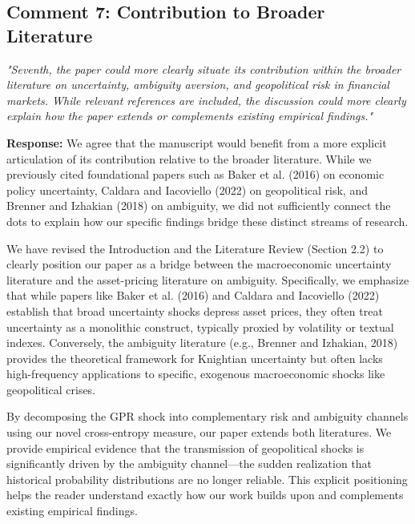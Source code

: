 \documentclass[12pt]{article}
\begin{document}
\subsection*{Comment 7: Contribution to Broader Literature}
\textit{"Seventh, the paper could more clearly situate its contribution within the broader literature on uncertainty, ambiguity aversion, and geopolitical risk in financial markets. While relevant references are included, the discussion could more clearly explain how the paper extends or complements existing empirical findings."}

\begin{highlightbox}
\textbf{Response:} We agree that the manuscript would benefit from a more explicit articulation of its contribution relative to the broader literature. While we previously cited foundational papers such as Baker et al. (2016) on economic policy uncertainty, Caldara and Iacoviello (2022) on geopolitical risk, and Brenner and Izhakian (2018) on ambiguity, we did not sufficiently connect the dots to explain how our specific findings bridge these distinct streams of research.

We have revised the Introduction and the Literature Review (Section 2.2) to clearly position our paper as a bridge between the macroeconomic uncertainty literature and the asset-pricing literature on ambiguity. Specifically, we emphasize that while papers like Baker et al. (2016) and Caldara and Iacoviello (2022) establish that broad uncertainty shocks depress asset prices, they often treat uncertainty as a monolithic construct, typically proxied by volatility or textual indexes. Conversely, the ambiguity literature (e.g., Brenner and Izhakian, 2018) provides the theoretical framework for Knightian uncertainty but often lacks high-frequency applications to specific, exogenous macroeconomic shocks like geopolitical crises.

By decomposing the GPR shock into complementary risk and ambiguity channels using our novel cross-entropy measure, our paper extends both literatures. We provide empirical evidence that the transmission of geopolitical shocks is significantly driven by the ambiguity channel—the sudden realization that historical probability distributions are no longer reliable. This explicit positioning helps the reader understand exactly how our work builds upon and complements existing empirical findings.
\end{highlightbox}
\end{document}
